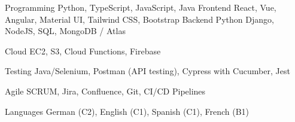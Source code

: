

\begin{cvskills}

  \cvskill
    {Programming}
    {Python, TypeScript, JavaScript, Java}
  \cvskill
    {Frontend} %
    {React, Vue, Angular, Material UI, Tailwind CSS, Bootstrap}
  \cvskill
    {Backend}
    {Python Django, NodeJS, SQL, MongoDB / Atlas}

  \cvskill
    {Cloud} 
    {EC2, S3, Cloud Functions, Firebase}
    
  \cvskill
    {Testing}
    {Java/Selenium, Postman (API testing), Cypress with Cucumber, Jest}

  \cvskill
    {Agile}
    {SCRUM, Jira, Confluence, Git, CI/CD Pipelines} %

  \cvskill
    {Languages}
    {German (C2), English (C1), Spanish (C1), French (B1)}

\end{cvskills}

